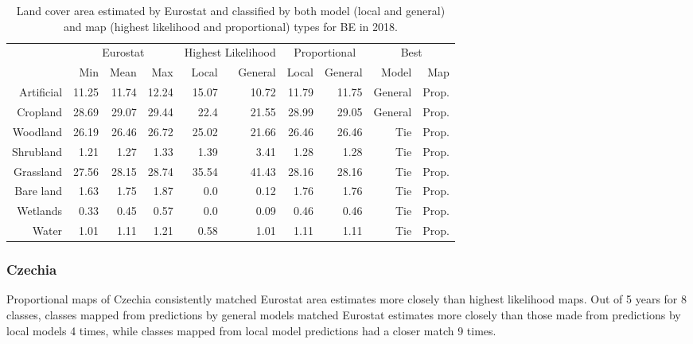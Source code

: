     \begin{table}[H]
    \centering
    \caption{Land cover area estimated by Eurostat and classified by both model (local and general) and map (highest likelihood and proportional) types for BE in 2018.}
    
    \begin{tabular}{r|rrr|rr|rr|rr}
    \toprule
    {} & \multicolumn{3}{|c}{Eurostat} & \multicolumn{2}{|c}{Highest Likelihood} & \multicolumn{2}{|c}{Proportional} & \multicolumn{2}{|c}{Best} \\
    {} &      Min &   Mean &    Max &              Local & General &        Local & General &    Model &    Map \\
    \midrule
    Artificial &    11.25 &  11.74 &  12.24 &              15.07 &   10.72 &        11.79 &   11.75 &  General &  Prop. \\
    Cropland   &    28.69 &  29.07 &  29.44 &               22.4 &   21.55 &        28.99 &   29.05 &  General &  Prop. \\
    Woodland   &    26.19 &  26.46 &  26.72 &              25.02 &   21.66 &        26.46 &   26.46 &      Tie &  Prop. \\
    Shrubland  &     1.21 &   1.27 &   1.33 &               1.39 &    3.41 &         1.28 &    1.28 &      Tie &  Prop. \\
    Grassland  &    27.56 &  28.15 &  28.74 &              35.54 &   41.43 &        28.16 &   28.16 &      Tie &  Prop. \\
    Bare land  &     1.63 &   1.75 &   1.87 &                0.0 &    0.12 &         1.76 &    1.76 &      Tie &  Prop. \\
    Wetlands   &     0.33 &   0.45 &   0.57 &                0.0 &    0.09 &         0.46 &    0.46 &      Tie &  Prop. \\
    Water      &     1.01 &   1.11 &   1.21 &               0.58 &    1.01 &         1.11 &    1.11 &      Tie &  Prop. \\
    \bottomrule
    \end{tabular}
    \end{table}
    
    \subsubsection{Czechia}
    Proportional maps of Czechia consistently matched Eurostat area estimates more closely than highest likelihood maps. Out of 5 years for 8 classes, classes mapped from predictions by general models matched Eurostat estimates more closely than those made from predictions by local models 4 times, while classes mapped from local model predictions had a closer match 9 times.
    
